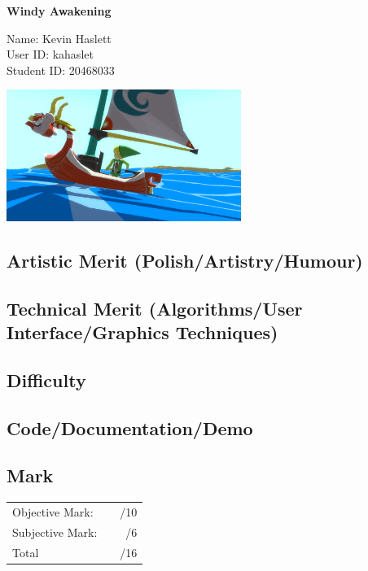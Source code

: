 \documentclass{article}
\newcommand\projecttitle{Windy Awakening}
\newcommand\myname{Kevin Haslett}
\newcommand\myuserid{kahaslet}
\newcommand\mystudentid{20468033}
\begin{document}
\begin{minipage}[t]{3in}
{\huge \bf 
	\projecttitle 
}

\medskip
Name: \myname \\ 
User ID: \myuserid \\ 
Student ID: \mystudentid 
\end{minipage}
\hfill
\begin{minipage}[t]{3in}
\vspace{0pt}
\includegraphics[width=3in]{screenshot1.png}   %
\end{minipage}


\subsection*{Artistic Merit (Polish/Artistry/Humour)}
\vfill
\subsection*{Technical Merit (Algorithms/User Interface/Graphics Techniques)}
\vfill
\subsection*{Difficulty}
\vfill
\subsection*{Code/Documentation/Demo}
\vfill
\subsection*{Mark}
\begin{center}
\begin{tabular}{lr}
Objective Mark: &~~/10\\
Subjective Mark: &~~/6\\
\hline
Total &~~/16
\end{tabular}
\end{center}
\end{document}
